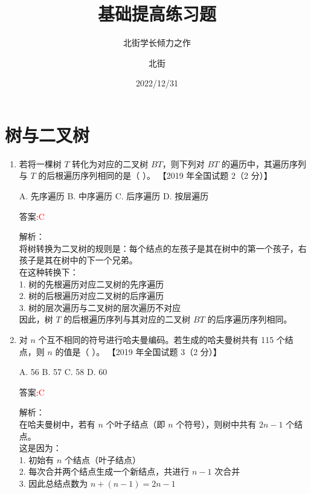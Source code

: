 \documentclass[lang=cn,newtx,10pt,scheme=chinese]{../../../elegantbook}
\title{基础提高练习题}
\subtitle{北街学长倾力之作}
\author{北街}
\date{2022/12/31}
\begin{document}
\maketitle
\frontmatter

\tableofcontents

\mainmatter


\chapter{树与二叉树}


\begin{enumerate}
        \item 若将一棵树 $T$ 转化为对应的二叉树 $BT$，则下列对 $BT$ 的遍历中，其遍历序列与 $T$ 的后根遍历序列相同的是（ ）。  
        【2019 年全国试题 2（2 分）】  
    
        A. 先序遍历 \quad B. 中序遍历 \quad C. 后序遍历 \quad D. 按层遍历  
    
        答案:\textcolor{red}{C}
        
        解析：\\
        将树转换为二叉树的规则是：每个结点的左孩子是其在树中的第一个孩子，右孩子是其在树中的下一个兄弟。\\
        在这种转换下：\\
        1. 树的先根遍历对应二叉树的先序遍历\\
        2. 树的后根遍历对应二叉树的后序遍历\\
        3. 树的层次遍历与二叉树的层次遍历不对应\\
        因此，树 $T$ 的后根遍历序列与其对应的二叉树 $BT$ 的后序遍历序列相同。\\
    
        \item 对 $n$ 个互不相同的符号进行哈夫曼编码。若生成的哈夫曼树共有 115 个结点，则 $n$ 的值是（ ）。  
        【2019 年全国试题 3（2 分）】  
    
        A. 56 \quad B. 57 \quad C. 58 \quad D. 60  
    
        答案:\textcolor{red}{C}
        
        解析：\\
        在哈夫曼树中，若有 $n$ 个叶子结点（即 $n$ 个符号），则树中共有 $2n-1$ 个结点。\\
        这是因为：\\
        1. 初始有 $n$ 个结点（叶子结点）\\
        2. 每次合并两个结点生成一个新结点，共进行 $n-1$ 次合并\\
        3. 因此总结点数为 $n + (n-1) = 2n-1$\\
        

\end{enumerate}
\end{document}
